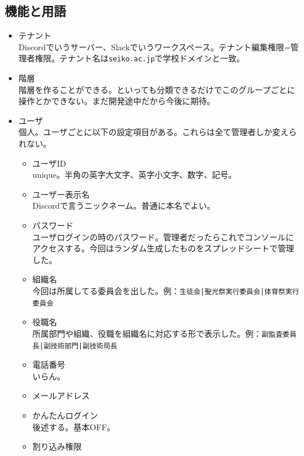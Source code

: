 \documentclass[dvipdfmx,jb5]{jreport}
\newcommand{\terlogy}[2][|]{\colorbox{terlogy}{\texttt{\lstinline#1#2#1}}}
\begin{document}
\subsection{機能と用語}
\begin{itemize}
      \item テナント\\
            Discordでいうサーバー、Slackでいうワークスペース。テナント編集権限=管理者権限。テナント名は\terlogy{seiko.ac.jp}で学校ドメインと一致。
      \item 階層\\
            階層を作ることができる。といっても分類できるだけでこのグループごとに操作とかできない。まだ開発途中だから今後に期待。
      \item ユーザ\\
            個人。ユーザごとに以下の設定項目がある。これらは全て管理者しか変えられない。
            \begin{itemize}
                  \item ユーザID\\
                        unique。半角の英字大文字、英字小文字、数字、記号。
                  \item ユーザー表示名\\
                        Discordで言うニックネーム。普通に本名でよい。
                  \item パスワード\\
                        ユーザログインの時のパスワード。管理者だったらこれでコンソールにアクセスする。今回はランダム生成したものをスプレッドシートで管理した。
                  \item 組織名\\
                        今回は所属してる委員会を出した。例：\verb"生徒会|聖光祭実行委員会|体育祭実行委員会"
                  \item 役職名\\
                        所属部門や組織、役職を組織名に対応する形で表示した。例：\verb"副監査委員長|副技術部門|副技術局長"
                  \item 電話番号\\
                        いらん。
                  \item メールアドレス
                  \item かんたんログイン\\
                        後述する。基本OFF。
                  \item 割り込み権限\\

\end{itemize}
\end{itemize}
\end{document}
